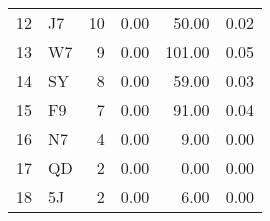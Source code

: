 \begin{tabular}{rlrrrr}
 12 & J7        &                         10 &                        0.00 &                                   50.00 &                                     0.02 \\
 13 & W7        &                          9 &                        0.00 &                                  101.00 &                                     0.05 \\
 14 & SY        &                          8 &                        0.00 &                                   59.00 &                                     0.03 \\
 15 & F9        &                          7 &                        0.00 &                                   91.00 &                                     0.04 \\
 16 & N7        &                          4 &                        0.00 &                                    9.00 &                                     0.00 \\
 17 & QD        &                          2 &                        0.00 &                                    0.00 &                                     0.00 \\
 18 & 5J        &                          2 &                        0.00 &                                    6.00 &                                     0.00 \\
\hline
\end{tabular}